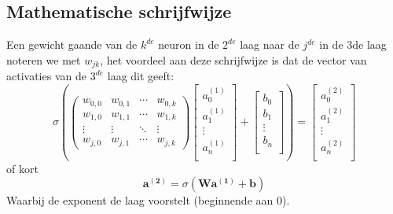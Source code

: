 \documentclass[10pt,a4paper,twoside]{article}
\begin{document}
\subsection{Mathematische schrijfwijze}
Een gewicht gaande van de $k^{de}$ neuron in de $2^{de}$ laag naar de $j^{de}$ in de 3de laag noteren we met $w_{jk}$, het voordeel aan deze schrijfwijze is dat de vector van activaties van de $3^{de}$ laag dit geeft:
\begin{equation}
\sigma\left(
\begin{pmatrix}
w_{0,0} & w_{0,1} & \cdots & w_{0,k} \\
w_{1,0} & w_{1,1} & \cdots & w_{1,k} \\
\vdots  & \vdots  & \ddots & \vdots  \\
w_{j,0} & w_{j,1} & \cdots & w_{j,k} 
\end{pmatrix}
%
\begin{bmatrix}
a_0^{(1)} \\
a_1^{(1)} \\
\vdots \\
a_n^{(1)} \\
\end{bmatrix} 
%
+
\begin{bmatrix}
b_0\\
b_1\\
\vdots \\
b_n\\
\end{bmatrix} 
\right)
=
%
\begin{bmatrix}
a_0^{(2)} \\
a_1^{(2)} \\
\vdots \\
a_n^{(2)}\\
\end{bmatrix} 
\end{equation}
of kort
\begin{equation}
	\mathbf{a^{(2)}} = \sigma(\mathbf{Wa^{(1)} + b})
	\label{vergelijking_22}
\end{equation}
Waarbij de exponent de laag voorstelt (beginnende aan 0).
\end{document}
